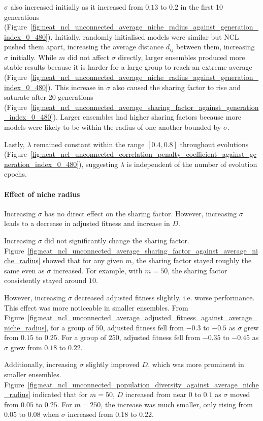 $\sigma$ also increased initially as it increased from $0.13$ to $0.2$ in the first 10 generations (Figure~\ref{fig:neat_ncl_unconnected_average_niche_radius_against_generation_index_0_480}). Initially, randomly initialised models were similar but NCL pushed them apart, increasing the average distance $d_{ij}$ between them, increasing $\sigma$ initially. While $m$ did not affect $\sigma$ directly, larger ensembles produced more stable results because it is harder for a large group to reach an extreme average (Figure~\ref{fig:neat_ncl_unconnected_average_niche_radius_against_generation_index_0_480}). This increase in $\sigma$ also caused the sharing factor to rise and saturate after 20 generations (Figure~\ref{fig:neat_ncl_unconnected_average_sharing_factor_against_generation_index_0_480}). Larger ensembles had higher sharing factors because more models were likely to be within the radius of one another bounded by $\sigma$. 

Lastly, $\lambda$ remained constant within the range $[0.4, 0.8]$ throughout evolutions (Figure~\ref{fig:neat_ncl_unconnected_correlation_penalty_coefficient_against_generation_index_0_480}), suggesting $\lambda$ is independent of the number of evolution epochs. 

\paragraph{Effect of niche radius}
Increasing $\sigma$ has no direct effect on the sharing factor. However, increasing $\sigma$ leads to a decrease in adjusted fitness and increase in $D$. 

Increasing $\sigma$ did not significantly change the sharing factor. Figure~\ref{fig:neat_ncl_unconnected_average_sharing_factor_against_average_niche_radius} showed that for any given $m$, the sharing factor stayed roughly the same even as $\sigma$ increased. For example, with $m = 50$, the sharing factor consistently stayed around $10$.

However, increasing $\sigma$ decreased adjusted fitness slightly, i.e. worse performance. This effect was more noticeable in smaller ensembles. From Figure~\ref{fig:neat_ncl_unconnected_average_adjusted_fitness_against_average_niche_radius}, for a group of $50$, adjusted fitness fell from $-0.3$ to $-0.5$ as $\sigma$ grew from $0.15$ to $0.25$. For a group of $250$, adjusted fitness fell from $-0.35$ to $-0.45$ as $\sigma$ grew from $0.18$ to $0.22$. 

Additionally, increasing $\sigma$ slightly improved $D$, which was more prominent in smaller ensembles. Figure~\ref{fig:neat_ncl_unconnected_population_diversity_against_average_niche_radius} indicated that for $m = 50$, $D$ increased from near $0$ to $0.1$ as $\sigma$ moved from $0.05$ to $0.25$. For $m = 250$, the increase was much smaller, only rising from $0.05$ to $0.08$ when $\sigma$ increased from $0.18$ to $0.22$. 

